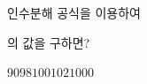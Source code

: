 인수분해 공식을 이용하여 \par\smallskip{}\par\smallskip\noindent 의 값을 구하면?
\begin{choices32}{$90$}{$98$}{$100$}{$102$}{$1000$}\end{choices32}
